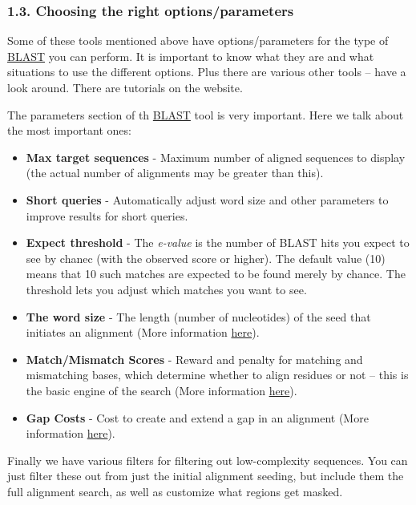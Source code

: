 \documentclass[]{article}
\begin{document}
\subsubsection{1.3. Choosing the right
options/parameters}\label{choosing-the-right-optionsparameters}

Some of these tools mentioned above have options/parameters for the type
of \href{http://blast.ncbi.nlm.nih.gov/}{BLAST} you can perform. It is
important to know what they are and what situations to use the different
options. Plus there are various other tools -- have a look around. There
are tutorials on the website.

The parameters section of th
\href{http://blast.ncbi.nlm.nih.gov/}{BLAST} tool is very important.
Here we talk about the most important ones:

\begin{itemize}
\itemsep1pt\parskip0pt
\item
  \textbf{Max target sequences} - Maximum number of aligned sequences to
  display (the actual number of alignments may be greater than this).
\item
  \textbf{Short queries} - Automatically adjust word size and other
  parameters to improve results for short queries.
\item
  \textbf{Expect threshold} - The \emph{e-value} is the number of BLAST
  hits you expect to see by chanec (with the observed score or higher).
  The default value (10) means that 10 such matches are expected to be
  found merely by chance. The threshold lets you adjust which matches
  you want to see.
\item
  \textbf{The word size} - The length (number of nucleotides) of the
  seed that initiates an alignment (More information
  \href{http://www.ncbi.nlm.nih.gov/BLAST/blastcgihelp.shtml\#wordsize}{here}).
\item
  \textbf{Match/Mismatch Scores} - Reward and penalty for matching and
  mismatching bases, which determine whether to align residues or not --
  this is the basic engine of the search (More information
  \href{http://www.ncbi.nlm.nih.gov/BLAST/blastcgihelp.shtml\#Reward-penalty}{here}).
\item
  \textbf{Gap Costs} - Cost to create and extend a gap in an alignment
  (More information
  \href{http://www.ncbi.nlm.nih.gov/BLAST/blastcgihelp.shtml\#Reward-penalty}{here}).
\end{itemize}

Finally we have various filters for filtering out low-complexity
sequences. You can just filter these out from just the initial alignment
seeding, but include them the full alignment search, as well as
customize what regions get masked.
\end{document}
